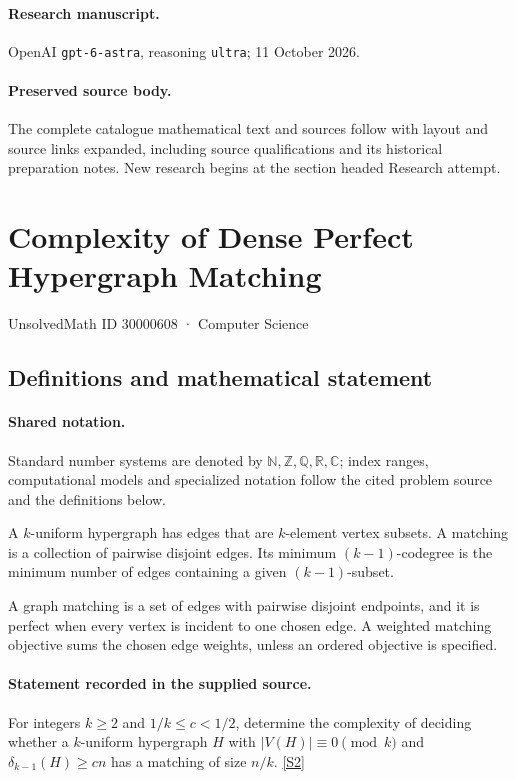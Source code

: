 \documentclass[11pt]{article}
\begin{document}
\paragraph{Research manuscript.} OpenAI \texttt{gpt-6-astra}, reasoning \texttt{ultra}; 11 October 2026.
\paragraph{Preserved source body.} The complete catalogue mathematical text and sources follow with layout and source links expanded, including source qualifications and its historical preparation notes. New research begins at the section headed Research attempt.

\section{Complexity of Dense Perfect Hypergraph Matching}\label{30000608}
{\small UnsolvedMath ID 30000608 · Computer Science}
\subsection{Definitions and mathematical statement}

\paragraph{Shared notation.}Standard number systems are denoted by $\mathbb N,\mathbb Z,\mathbb Q,\mathbb R,\mathbb C$; index ranges, computational models and specialized notation follow the cited problem source and the definitions below.


A $k$-uniform hypergraph has edges that are $k$-element vertex subsets. A matching is a collection of pairwise disjoint edges. Its minimum $(k-1)$-codegree is the minimum number of edges containing a given $(k-1)$-subset.

A graph matching is a set of edges with pairwise disjoint endpoints, and it is perfect when every vertex is incident to one chosen edge. A weighted matching objective sums the chosen edge weights, unless an ordered objective is specified.
\paragraph{Statement recorded in the supplied source.}
For integers $k\geq2$ and $1/k\leq c<1/2$, determine the complexity of deciding whether a $k$-uniform hypergraph $H$ with $|V(H)|\equiv0\pmod k$ and $\delta_{k-1}(H)\geq cn$ has a matching of size $n/k$. \href{https://doi.org/10.4171/owr/2006/48}{[S2]}
\end{document}
